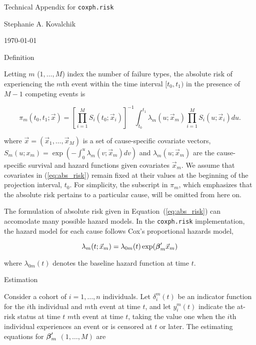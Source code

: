 \documentclass[11pt]{article}
\makeatletter
\newcommand{\bbeta}{\mbox{\boldmath$\beta$}}
\renewcommand{\section}{\@startsection{section}{1}{0mm}
   {\baselineskip}%
   {\baselineskip}{\normalfont\normalsize\scshape}}%
\makeatother
\begin{document}
\begin{center}
{\large 
Technical Appendix for \texttt{coxph.risk}

Stephanie A. Kovalchik

\today
}
\end{center}

\section{Definition}

Letting $m$ ($1,\dots,M$) index the number of failure types, the absolute risk of experiencing the $m$th event within the time interval $[t_0, t_1)$ in the presence of $M-1$ competing events is

\begin{equation}
\pi_m(t_0,t_1;\vec{x}) = \left[ \prod_{i=1}^M S_{i}(t_0;\vec{x}_i)  \right]^{-1} \int_{t_0}^{t_1} \lambda_{m}(u;\vec{x}_m) \prod_{i=1}^M S_{i}(u;\vec{x}_i) du.
\label{eq:abs_risk}
\end{equation}

\noindent where $\vec{x} = (\vec{x}_1,\dots,\vec{x}_M)$ is a set of  cause-specific covariate vectors, $S_m(u;x_m) = \exp (- \int_0^u \lambda_m(v;\vec{x}_m) dv )$ and $\lambda_{m}(u;\vec{x}_m)$ are the cause-specific survival and hazard functions given covariates $\vec{x}_m$. 
We assume that covariates in (\ref{eq:abs_risk}) remain fixed at their values at the beginning of the projection interval, $t_0$. For simplicity, the subscript in $\pi_m$, which emphasizes that the absolute risk pertains to a particular cause, will be omitted from here on. 

The formulation of absolute risk given in Equation~(\ref{eq:abs_risk}) can accomodate many possible hazard models. In the \texttt{coxph.risk} implementation, the hazard model for each cause follows Cox's proportional hazards model,

\begin{equation}
\lambda_m (t;\vec{x}_m) = \lambda_{0m} (t) \exp ( \bbeta_m'\vec{x}_m )
\label{eq:hazard}
\end{equation}

\noindent where $\lambda_{0m}(t)$ denotes the baseline hazard function at time $t$. 

\section{Estimation}

Consider a cohort of $i = 1,\dots, n$ individuals. Let $\delta^m_i (t)$ be an indicator function for the $i$th individual and $m$th event at time $t$, and let $y^m_i (t)$ indicate the at-risk status at time $t$ $m$th event at time $t$, taking the value one when the $i$th individual experiences an event or is censored at $t$ or later. The estimating equations for $\bbeta_m'$ $(1,\dots,M)$ are
\end{document}
